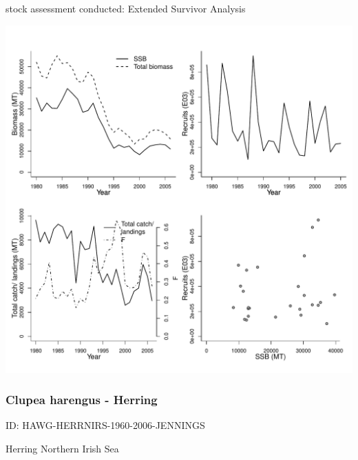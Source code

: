 stock assessment conducted: Extended Survivor Analysis 
\begin{center}
\vspace{-0.2cm}\includegraphics[scale=0.65]{../tex/figures/plot-WGBFAS-HERR31-1979-2006-JENNINGS.pdf}
\end{center}

\newpage
\subsubsection{Clupea harengus - Herring}
ID: HAWG-HERRNIRS-1960-2006-JENNINGS

Herring Northern Irish Sea 

